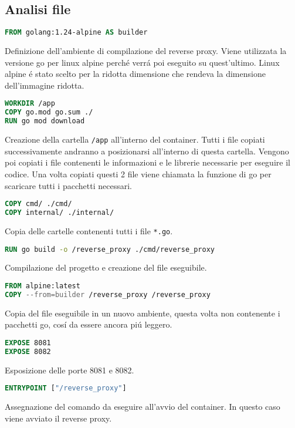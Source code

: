 \subsection{Analisi file}
\begin{lstlisting}[language=Dockerfile]
FROM golang:1.24-alpine AS builder
\end{lstlisting}
Definizione dell'ambiente di compilazione del reverse proxy. Viene utilizzata la versione go per linux alpine perché verrá poi eseguito su quest'ultimo. Linux alpine é stato scelto per la ridotta dimensione che rendeva la dimensione dell'immagine ridotta.
\\
\begin{lstlisting}[language=Dockerfile]
WORKDIR /app
COPY go.mod go.sum ./
RUN go mod download
\end{lstlisting}
Creazione della cartella \texttt{/app} all'interno del container. Tutti i file copiati successivamente andranno a posizionarsi all'interno di questa cartella. Vengono poi copiati i file contenenti le informazioni e le librerie necessarie per eseguire il codice. Una volta copiati questi 2 file viene chiamata la funzione di go per scaricare tutti i pacchetti necessari.
\\
\begin{lstlisting}[language=Dockerfile]
COPY cmd/ ./cmd/
COPY internal/ ./internal/
\end{lstlisting}
Copia delle cartelle contenenti tutti i file \texttt{*.go}.
\\
\begin{lstlisting}[language=Dockerfile]
RUN go build -o /reverse_proxy ./cmd/reverse_proxy
\end{lstlisting}
Compilazione del progetto e creazione del file eseguibile.
\\
\begin{lstlisting}[language=Dockerfile]
FROM alpine:latest
COPY --from=builder /reverse_proxy /reverse_proxy
\end{lstlisting}
Copia del file eseguibile in un nuovo ambiente, questa volta non contenente i pacchetti go, cosí da essere ancora piú leggero.
\\
\begin{lstlisting}[language=Dockerfile]
EXPOSE 8081
EXPOSE 8082
\end{lstlisting}
Esposizione delle porte 8081 e 8082.
\\
\begin{lstlisting}[language=Dockerfile]
ENTRYPOINT ["/reverse_proxy"]
\end{lstlisting}
Assegnazione del comando da eseguire all'avvio del container. In questo caso viene avviato il reverse proxy.


